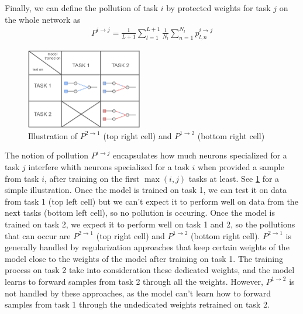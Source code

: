 \documentclass[twocolumn]{article}
\begin{document}
\noindent
Finally, we can define the pollution of task $i$ by protected weights for task $j$ on the whole network as
\begin{align}
    P^{i\rightarrow j} = \frac{1}{L+1}\sum_{l=1}^{L+1}{\frac{1}{N_l}\sum_{n=1}^{N_l}{p_{l,n}^{i\rightarrow j}}}
\end{align}


\begin{figure}
    \centering
    \includegraphics[width=0.45\textwidth]{images/pollution_update.png}
    \caption{Illustration of $P^{2\rightarrow 1}$ (top right cell) and $P^{1\rightarrow 2}$ (bottom right cell)}
    \label{fig:pollution}
\end{figure}


\vspace{1mm}
\noindent
The notion of pollution $P^{i\rightarrow j}$ encapsulates how much neurons specialized for a task $j$ interfere whith neurons specialized for a task $i$ when provided a sample from task $i$, after training on the first $\max(i,j)$ tasks at least. See \ref{fig:pollution} for a simple illustration. Once the model is trained on task 1, we can test it on data from task 1 (top left cell) but we can't expect it to perform well on data from the next tasks (bottom left cell), so no pollution is occuring. Once the model is trained on task 2, we expect it to perform well on task 1 and 2, so the pollutions that can occur are $P^{2\rightarrow 1}$ (top right cell) and $P^{1\rightarrow 2}$ (bottom right cell). $P^{2\rightarrow 1}$ is generally handled by regularization approaches that keep certain weights of the model close to the weights of the model after training on task 1. The training process on task 2 take into consideration these dedicated weights, and the model learns to forward samples from task 2 through all the weights. However, $P^{1\rightarrow 2}$ is not handled by these approaches, as the model can't learn how to forward samples from task 1 through the undedicated weights retrained on task 2.
\end{document}
